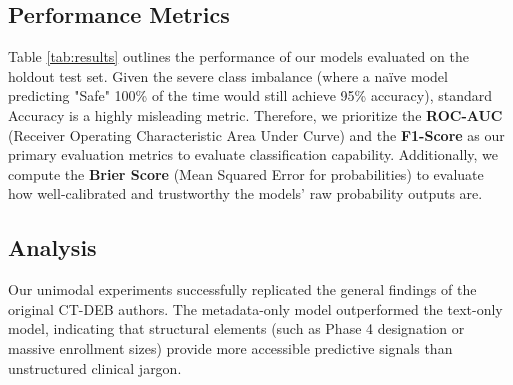 \documentclass[11pt,a4paper]{article}
\begin{document}
\subsection{Performance Metrics}
Table \ref{tab:results} outlines the performance of our models evaluated on the holdout test set. Given the severe class imbalance (where a naïve model predicting "Safe" 100\% of the time would still achieve 95\% accuracy), standard Accuracy is a highly misleading metric. Therefore, we prioritize the \textbf{ROC-AUC} (Receiver Operating Characteristic Area Under Curve) and the \textbf{F1-Score} as our primary evaluation metrics to evaluate classification capability. Additionally, we compute the \textbf{Brier Score} (Mean Squared Error for probabilities) to evaluate how well-calibrated and trustworthy the models' raw probability outputs are.

\begin{table}[h!]
\centering
{}
\caption{Comprehensive test-set classification performance across different modeling strategies. Best performance per metric is shown in bold.}
\label{tab:results}
\end{table}

\subsection{Analysis}
Our unimodal experiments successfully replicated the general findings of the original CT-DEB authors. The metadata-only model outperformed the text-only model, indicating that structural elements (such as Phase 4 designation or massive enrollment sizes) provide more accessible predictive signals than unstructured clinical jargon.
\end{document}
